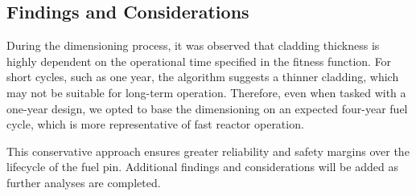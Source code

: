 \subsection{Findings and Considerations}

During the dimensioning process, it was observed that cladding thickness is highly dependent on the operational time specified in the fitness function. For short cycles, such as one year, the algorithm suggests a thinner cladding, which may not be suitable for long-term operation. Therefore, even when tasked with a one-year design, we opted to base the dimensioning on an expected four-year fuel cycle, which is more representative of fast reactor operation.

This conservative approach ensures greater reliability and safety margins over the lifecycle of the fuel pin. Additional findings and considerations will be added as further analyses are completed.